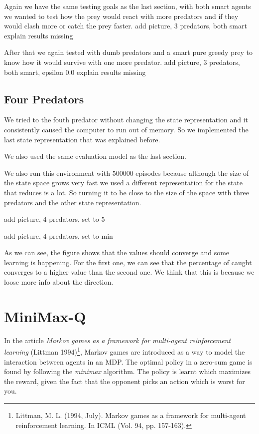 \documentclass{article}
\begin{document}
Again we have the same testing goals as the last section, with both smart agents
we wanted to test how the prey would react with more predators and if they would
clash more or catch the prey faster.
\error add picture, 3 predators, both smart
\error explain results missing

After that we again tested with dumb predators and a smart pure greedy prey to
know how it would survive with one more predator.
\error add picture, 3 predators, both smart, epsilon 0.0
\error explain results missing

\subsection{Four Predators}
We tried to the fouth predator without changing the state representation and
it consistently caused the computer to run out of memory. So we implemented
the last state representation that was explained before. 

We also used the same evaluation model as the last section.

We also run this environment with $500000$ episodes because although the size of
the state space grows very fast we used a different representation for the
state that reduces is a lot. So turning it to be close to the size of the space
with three predators and the other state representation.

\error add picture, 4 predators, set to 5

\error add picture, 4 predators, set to min

As we can see, the figure shows that the values should converge and some
learning is happening. For the first one, we can see that the percentage of
caught converges to a higher value than the second one. We think that this is
because we loose more info about the direction. 
\section{MiniMax-Q}
In the article \emph{Markov games as a framework for multi-agent reinforcement learning} (Littman 1994)\footnote{Littman, M. L. (1994, July). Markov games as a framework for multi-agent reinforcement learning. In ICML (Vol. 94, pp. 157-163).}, Markov games are introduced as a way to model the interaction between agents in an MDP. The optimal policy in a zero-sum game is found by following the \emph{minimax} algorithm. The policy is learnt which maximizes the reward, given the fact that the opponent picks an action which is worst for you.
\end{document}
